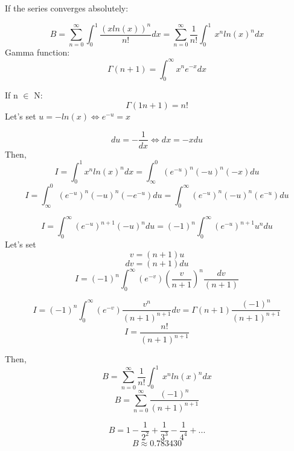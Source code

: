 \documentclass{article}
\begin{document}
	If the series converges absolutely:
	
	$$ B= \sum_{n=0}^{\infty} \int_0^1 \frac{(x ln(x))^n}{n!} dx = \sum_{n=0}^{\infty} \frac{1}{n!} \int_0^1\ x^n ln(x)^n dx $$
	\break
	Gamma function:
	$$ \Gamma(n+1) = \int_0^{\infty} x^n e^{-x} dx $$  
	\break
	
	If n $\in $ N:
	$$\Gamma(1n+1) = n! $$
	\break
	Let's set $ u = -ln(x) \Leftrightarrow e^{-u} = x $
	
	$$ du = - \frac{1}{dx} \Leftrightarrow dx= -x du $$
	\break
	Then,
	$$ I =\int_0^1 x^n ln(x)^n dx = \int_{\infty}^0 (e^{-u})^n (-u)^n (-x) du $$
	$$ I = \int_{\infty}^0 (e^{-u})^n (-u)^n (-e^{-u}) du = \int_{0}^{\infty} (e^{-u})^n (-u)^n (e^{-u}) du $$
	
	$$ I = \int_{0}^{\infty} (e^{-u})^{n+1} (-u)^n du = (-1)^n  \int_{0}^{\infty} (e^{-u})^{n+1} u^n du $$
	\break
	Let's set
	$$ v= (n+1) u$$
	$$ dv = (n+1) du$$
	$$I = (-1)^n \int_{0}^{\infty} (e^{-v}) \left(\frac{v}{n+1}\right)^n \frac{dv}{(n+1)} $$
	
	$$I = (-1)^n \int_{0}^{\infty} (e^{-v}) \frac{v^n}{(n+1)^{n+1}} dv = \Gamma(n+1) \frac{(-1)^n}{(n+1)^{n+1}}$$
	$$I = \frac{n!}{(n+1)^{n+1}}$$
	
	Then,
	\break
	$$B =\sum_{n=0}^{\infty} \frac{1}{n!} \int_0^1\ x^n ln(x)^n dx $$
	$$B =\sum_{n=0}^{\infty}  \frac{(-1)^n}{(n+1)^{n+1}}$$
	
	$$ B = 1 - \frac{1}{2^2} +\frac{1}{3^3} -\frac{1}{4^4} + ...$$
	\break
	$$B \approx 0.783430 $$
\end{document}
